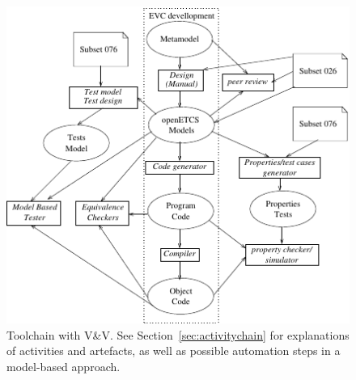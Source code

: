 \documentclass[11pt, a4paper]{article}
\begin{document}
%
%
%
%
%

\begin{figure} [htbp]
\includegraphics[width=\textwidth]{VandV.pdf}
\caption{Toolchain with V\&V. See Section~\ref{sec:activitychain} for explanations of activities and artefacts, as well as possible automation steps in a model-based approach.}
\label{fig:vandv}
\end{figure}

 
\end{document}
